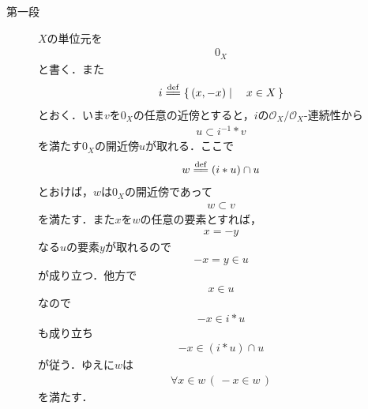 	\begin{sketch}\mbox{}
		\begin{description}
			\item[第一段] 
				$X$の単位元を
				\begin{align}
					0_X
				\end{align}
				と書く．また
				\begin{align}
					i \defeq \Set{(x,-x)}{x \in X}
				\end{align}
				とおく．いま$v$を$0_X$の任意の近傍とすると，$i$の$\mathscr{O}_X/\mathscr{O}_X$-連続性から
				\begin{align}
					u \subset i^{-1} \ast v
				\end{align}
				を満たす$0_X$の開近傍$u$が取れる．ここで
				\begin{align}
					w \defeq (i \ast u) \cap u
				\end{align}
				とおけば，$w$は$0_X$の開近傍であって
				\begin{align}
					w \subset v
				\end{align}
				を満たす．また$x$を$w$の任意の要素とすれば，
				\begin{align}
					x = -y
				\end{align}
				なる$u$の要素$y$が取れるので
				\begin{align}
					-x = y \in u
				\end{align}
				が成り立つ．他方で
				\begin{align}
					x \in u
				\end{align}
				なので
				\begin{align}
					-x \in i \ast u
				\end{align}
				も成り立ち
				\begin{align}
					-x \in (i \ast u) \cap u
				\end{align}
				が従う．ゆえに$w$は
				\begin{align}
					\forall x \in w\, (\, -x \in w\, )
				\end{align}
				を満たす．
				

\end{description}
\end{sketch}

